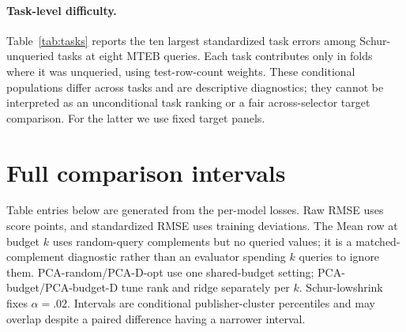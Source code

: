 \documentclass{article}
\begin{document}
\paragraph{Task-level difficulty.}
Table~\ref{tab:tasks} reports the ten largest standardized task errors among Schur-unqueried tasks at eight MTEB queries. Each task contributes only in folds where it was unqueried, using test-row-count weights. These conditional populations differ across tasks and are descriptive diagnostics; they cannot be interpreted as an unconditional task ranking or a fair across-selector target comparison. For the latter we use fixed target panels.
\begin{table}[h]
\centering\small
\caption{Conditional unqueried-task error at eight queries. ``Unselected folds'' counts the outer folds across all repetitions where the task remained a target.}
\label{tab:tasks}
\end{table}

\clearpage
\section{Full comparison intervals}
\label{app:full}
Table entries below are generated from the per-model losses. Raw RMSE uses score points, and standardized RMSE uses training deviations. The Mean row at budget $k$ uses random-query complements but no queried values; it is a matched-complement diagnostic rather than an evaluator spending $k$ queries to ignore them. PCA-random/PCA-D-opt use one shared-budget setting; PCA-budget/PCA-budget-D tune rank and ridge separately per $k$. Schur-lowshrink fixes $\alpha=.02$. Intervals are conditional publisher-cluster percentiles and may overlap despite a paired difference having a narrower interval.
\small

\normalsize
\clearpage

\end{document}
